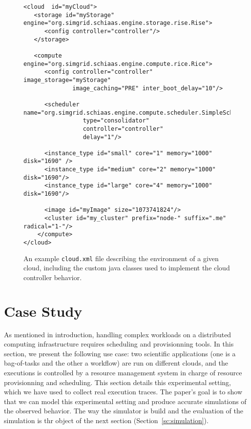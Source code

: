\begin{figure}[hbt] 
 \lstset{language=xml,label= ,caption= ,numbers=left}
\begin{lstlisting}
<cloud  id="myCloud">
   <storage id="myStorage" engine="org.simgrid.schiaas.engine.storage.rise.Rise">
      <config controller="controller"/>
   </storage>

   <compute engine="org.simgrid.schiaas.engine.compute.rice.Rice"> 		
      <config controller="controller" image_storage="myStorage"
              image_caching="PRE" inter_boot_delay="10"/>
  
      <scheduler name="org.simgrid.schiaas.engine.compute.scheduler.SimpleScheduler"
                 type="consolidator"
                 controller="controller"
                 delay="1"/>
  
      <instance_type id="small" core="1" memory="1000" disk="1690" />				
      <instance_type id="medium" core="2" memory="1000" disk="1690"/>
      <instance_type id="large" core="4" memory="1000" disk="1690"/>
  
      <image id="myImage" size="1073741824"/>
      <cluster id="my_cluster" prefix="node-" suffix=".me" radical="1-"/>  
    </compute>
</cloud>
\end{lstlisting}
\caption{An example \texttt{cloud.xml} file describing the environment of a
  given cloud, including the custom java classes used to implement the
  cloud controller behavior.}
\label{fg:cloud.xml}
\end{figure}


\section{Case Study}
\label{sc:context}

As  mentioned  in introduction,  handling  complex  workloads on  a  distributed
computing infrastructure  requires scheduling and provisionning  tools.  In this
section, we present the following use  case: two scientific applications (one is
a bag-of-tasks and  the other a workflow)  are run on different  clouds, and the
executions is controlled  by a resource management system in  charge of resource
provisionning and  scheduling. This  section details this  experimental setting,
which we have used to collect real execution traces. The paper's goal is to show
that we can model this experimental setting and produce accurate simulations of
the observed behavior. The way the simulator is build and the evaluation of the 
simulation is thr object of the next section (Section~\ref{sc:simulation}).


